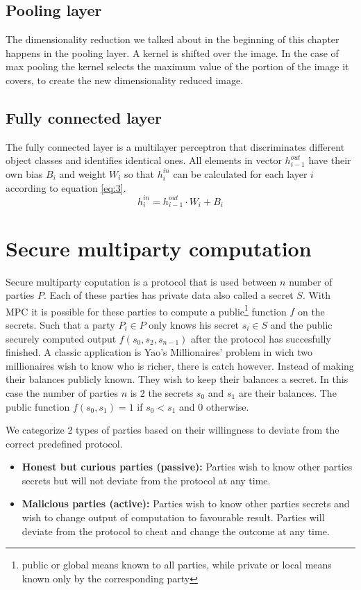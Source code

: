 \subsection{Pooling layer}
The dimensionality reduction we talked about in the beginning of this chapter happens in the pooling layer. A kernel is shifted over the image. In the case of max pooling the kernel selects the maximum value of the portion of the image it covers, to create the new dimensionality reduced image.

\subsection{Fully connected layer}
The fully connected layer is a multilayer perceptron that discriminates different object classes and identifies identical ones. All elements in vector $h_{i-1}^{out}$ have their own bias $B_i$ and weight $W_i$ so that $h_i^{in}$ can be calculated for each layer $i$ according to equation \ref{eq:3}.
\begin{equation} \label{eq:3}
  h_i^{in} = h_{i-1}^{out} \cdot W_i + B_i
\end{equation}

\section{Secure multiparty computation}
Secure multiparty coputation is a protocol that is used between $n$ number of parties $P$. Each of these parties has private data also called a secret $S$. With MPC it is possible for these parties to compute a public\footnote{public or global means known to all parties, while private or local means known only by the corresponding party} function $f$ on the secrets. Such that a party $P_i \in P$ only knows his secret $s_i \in S$ and the public securely computed output $f(s_0,s_2,s_{n-1})$ after the protocol has succesfully finished.
\newline
A classic application is Yao's Millionaires' problem \cite{yao1982protocols} in wich two millionaires wish to know who is richer, there is catch however. Instead of making their balances publicly known. They wish to keep their balances a secret. In this case the number of parties $n$ is 2 the secrets $s_0$ and $s_1$ are their balances. The public function $f(s_0,s_1)=1$ if $s_0<s_1$ and $0$ otherwise.

We categorize 2 types of parties based on their willingness to deviate from the correct predefined protocol.
\begin{itemize}
  \item \textbf{Honest but curious parties (passive):} Parties wish to know other parties secrets but will not deviate from the protocol at any time.
  \item \textbf{Malicious parties (active):} Parties wish to know other parties secrets and wish to change output of computation to favourable result. Parties will deviate from the protocol to cheat and change the outcome at any time.
\end{itemize}

